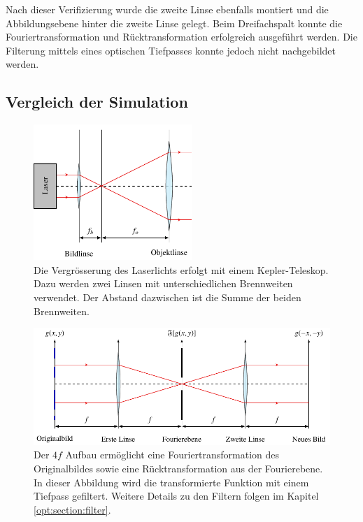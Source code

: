 Nach dieser Verifizierung wurde die zweite Linse ebenfalls montiert und die Abbildungsebene hinter die zweite Linse gelegt.
Beim Dreifachspalt konnte die Fouriertransformation und Rücktransformation erfolgreich ausgeführt werden.
Die Filterung mittels eines optischen Tiefpasses konnte jedoch nicht nachgebildet werden.

\subsection{Vergleich der Simulation}

\begin{figure}
    \centering
    \includegraphics[width=60mm]{papers/opt/images/laserAufweiten.pdf}
    \caption{Die Vergrösserung des Laserlichts erfolgt mit einem Kepler-Teleskop.
        Dazu werden zwei Linsen mit unterschiedlichen Brennweiten verwendet.
        Der Abstand dazwischen ist die Summe der beiden Brennweiten.}
    \label{opt:fig:laserAufweiten}
\end{figure}

\begin{figure}
    \centering
    \includegraphics[width=\textwidth]{papers/opt/images/4fAufbau.pdf}
    \caption{Der $4f$ Aufbau ermöglicht eine Fouriertransformation des Originalbildes sowie eine Rücktransformation aus der Fourierebene.
    In dieser Abbildung wird die transformierte Funktion mit einem Tiefpass gefiltert.
    Weitere Details zu den Filtern folgen im Kapitel \ref{opt:section:filter}.}
    \label{opt:fig:4fAufbau}
\end{figure}
